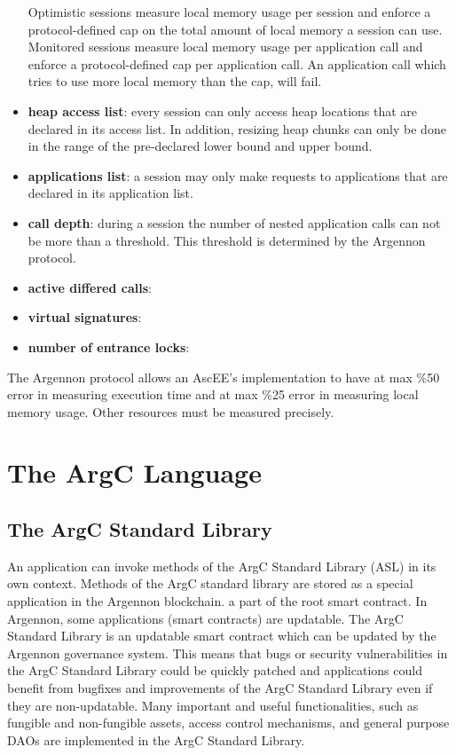 \begin{itemize}
    Optimistic sessions measure local memory usage per session and enforce a protocol-defined cap on the total amount
    of local memory a session can use. Monitored sessions measure local memory usage per
    application call and enforce a protocol-defined cap per application call. An application call which tries to use
    more local memory than the cap, will fail.
    \item \textbf{heap access list}:
    every session can only access heap locations that are declared in its access list. In addition,
    resizing heap chunks can only be done in the range of the pre-declared lower bound and upper bound.
    \item \textbf{applications list}:
    a session may only make requests to applications that are declared in its application list.
    \item \textbf{call depth}:
    during a session the number of nested application calls can not be more than a threshold. This threshold is
    determined by the Argennon protocol.
    \item \textbf{active differed calls}:
    \item \textbf{virtual signatures}:
    \item \textbf{number of entrance locks}:
\end{itemize}

The Argennon protocol allows an AscEE's implementation to have at max \%50 error in measuring execution time and at
max \%25 error in measuring local memory usage. Other resources must be measured precisely.


\section{The ArgC Language}\label{sec:the-argc-language}

\subsection{The ArgC Standard Library}\label{sec:asl}

An application can invoke methods of the ArgC Standard Library (ASL) in its own context. Methods of the ArgC standard
library are stored as a special application in the Argennon blockchain.
a part of the root smart contract.
In Argennon, some applications (smart contracts) are updatable. The ArgC Standard Library is an updatable smart
contract which can be updated by the Argennon governance
system. This means that bugs or security vulnerabilities in the ArgC Standard Library could be quickly patched and
applications could benefit from bugfixes and improvements of the ArgC Standard Library even if they are
non-updatable. Many important and useful functionalities,
such as fungible and non-fungible assets, access control mechanisms,
and general purpose DAOs are implemented in the ArgC Standard Library.

